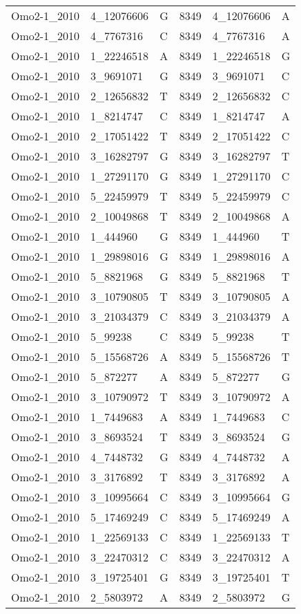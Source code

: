 \begin{center}
\begin{longtable}{|l|l|l|l|l|l|}
Omo2-1\_2010&4\_12076606&G&8349&4\_12076606&A\\
Omo2-1\_2010&4\_7767316&C&8349&4\_7767316&A\\
Omo2-1\_2010&1\_22246518&A&8349&1\_22246518&G\\
Omo2-1\_2010&3\_9691071&G&8349&3\_9691071&C\\
Omo2-1\_2010&2\_12656832&T&8349&2\_12656832&C\\
Omo2-1\_2010&1\_8214747&C&8349&1\_8214747&A\\
Omo2-1\_2010&2\_17051422&T&8349&2\_17051422&C\\
Omo2-1\_2010&3\_16282797&G&8349&3\_16282797&T\\
Omo2-1\_2010&1\_27291170&G&8349&1\_27291170&C\\
Omo2-1\_2010&5\_22459979&T&8349&5\_22459979&C\\
Omo2-1\_2010&2\_10049868&T&8349&2\_10049868&A\\
Omo2-1\_2010&1\_444960&G&8349&1\_444960&T\\
Omo2-1\_2010&1\_29898016&G&8349&1\_29898016&A\\
Omo2-1\_2010&5\_8821968&G&8349&5\_8821968&T\\
Omo2-1\_2010&3\_10790805&T&8349&3\_10790805&A\\
Omo2-1\_2010&3\_21034379&C&8349&3\_21034379&A\\
Omo2-1\_2010&5\_99238&C&8349&5\_99238&T\\
Omo2-1\_2010&5\_15568726&A&8349&5\_15568726&T\\
Omo2-1\_2010&5\_872277&A&8349&5\_872277&G\\
Omo2-1\_2010&3\_10790972&T&8349&3\_10790972&A\\
Omo2-1\_2010&1\_7449683&A&8349&1\_7449683&C\\
Omo2-1\_2010&3\_8693524&T&8349&3\_8693524&G\\
Omo2-1\_2010&4\_7448732&G&8349&4\_7448732&A\\
Omo2-1\_2010&3\_3176892&T&8349&3\_3176892&A\\
Omo2-1\_2010&3\_10995664&C&8349&3\_10995664&G\\
Omo2-1\_2010&5\_17469249&C&8349&5\_17469249&A\\
Omo2-1\_2010&1\_22569133&C&8349&1\_22569133&T\\
Omo2-1\_2010&3\_22470312&C&8349&3\_22470312&A\\
Omo2-1\_2010&3\_19725401&G&8349&3\_19725401&T\\
Omo2-1\_2010&2\_5803972&A&8349&2\_5803972&G\\

\end{longtable}
\end{center}
